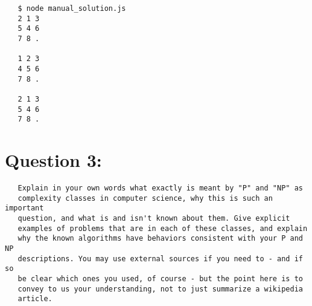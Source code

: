 \documentclass[11pt]{article}
\begin{document}
\begin{verbatim}
   $ node manual_solution.js
   2 1 3
   5 4 6
   7 8 .
   
   1 2 3
   4 5 6
   7 8 .
   
   2 1 3
   5 4 6
   7 8 .
\end{verbatim}

  
\section*{Question 3:}
\label{sec-3}

  
\begin{verbatim}
   Explain in your own words what exactly is meant by "P" and "NP" as
   complexity classes in computer science, why this is such an important
   question, and what is and isn't known about them. Give explicit
   examples of problems that are in each of these classes, and explain
   why the known algorithms have behaviors consistent with your P and NP
   descriptions. You may use external sources if you need to - and if so
   be clear which ones you used, of course - but the point here is to
   convey to us your understanding, not to just summarize a wikipedia
   article.
\end{verbatim}
\end{document}

